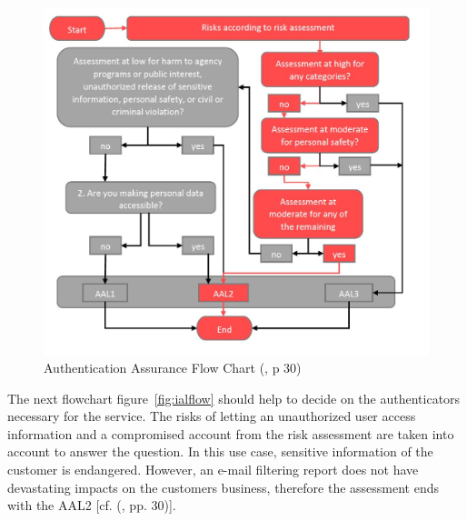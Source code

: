 \begin{figure}[h]
	\centering
	\includegraphics[width=1.0\linewidth]{images/aal_flow_colored}
	\caption{Authentication Assurance Flow Chart (\cite{NIST:2017:DIG}, p 30)}
	\label{fig:aalflow}
\end{figure}

The next flowchart figure~\ref{fig:ialflow} should help to decide on the authenticators necessary for the service. The risks of letting an unauthorized user access information and a compromised account from the risk assessment are taken into account to answer the question. In this use case, sensitive information of the customer is endangered. However, an e-mail filtering report does not have devastating impacts on the customers business, therefore the assessment ends with the AAL2 [cf. (\cite{NIST:2017:DIG}, pp. 30)].  


